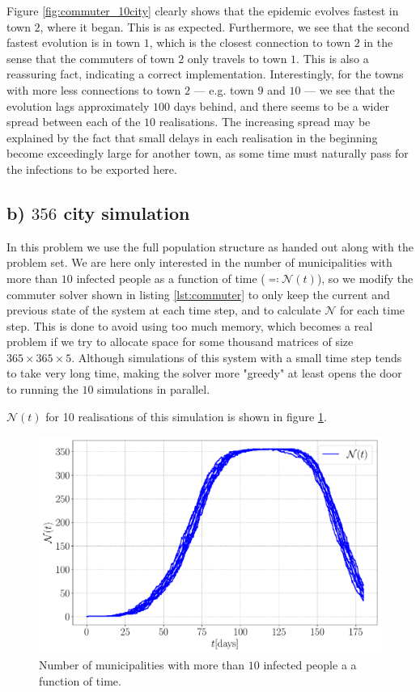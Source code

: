 Figure \ref{fig:commuter_10city} clearly shows that the epidemic evolves fastest in town $2$, where it began. This is as expected. Furthermore, we see that the second fastest evolution is in town $1$, which is the closest connection to town $2$ in the sense that the commuters of town $2$ only travels to town $1$. This is also a reassuring fact, indicating a correct implementation. Interestingly, for the towns with more less connections to town $2$ --- e.g. town $9$ and $10$ --- we see that the evolution lags approximately $100$ days behind, and there seems to be a wider spread between each of the $10$ realisations. The increasing spread may be explained by the fact that small delays in each realisation in the beginning become exceedingly large for another town, as some time must naturally pass for the infections to be exported here.

\subsection{b) $356$ city simulation}

In this problem we use the full population structure as handed out along with the problem set. We are here only interested in the number of municipalities with more than $10$ infected people as a function of time ($\eqqcolon \mathcal{N}(t)$), so we modify the commuter solver shown in listing \ref{lst:commuter} to only keep the current and previous state of the system at each time step, and to calculate $\mathcal{N}$ for each time step. This is done to avoid using too much memory, which becomes a real problem if we try to allocate space for some thousand matrices of size $365 \times 365 \times 5$. Although simulations of this system with a small time step tends to take very long time, making the solver more "greedy" at least opens the door to running the $10$ simulations in parallel. 

$\mathcal{N}(t)$ for 10 realisations of this simulation is shown in figure \ref{fig:infected_Eb}.  

\begin{figure}[htb]
	\centering
	\includegraphics[width=0.9\columnwidth]{../fig/2Eb_N.pdf}
	\caption{Number of municipalities with more than $10$ infected people a a function of time.}
	\label{fig:infected_Eb}
\end{figure}


